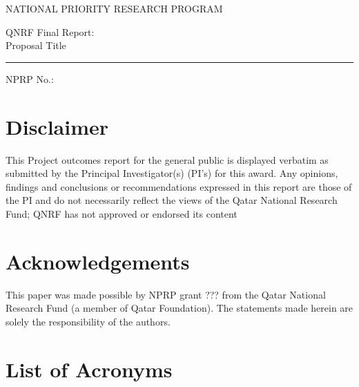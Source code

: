 \documentclass[11pt,letterpaper]{article}
\begin{document}
\begin{titlepage}
\begin{center}
\fontsize{11}{15}
\selectfont
NATIONAL PRIORITY RESEARCH PROGRAM

\vspace{4.5cm}

\fontsize{40}{48}
\selectfont
QNRF Final Report:\\
Proposal Title
\vspace{0.4cm}
{\color{blue2}\hrule}
\vspace{0.4cm}
\fontsize{22}{26}
\selectfont
NPRP No.:

\end{center}
\end{titlepage}

\rfoot{}

\newpage
\section*{Disclaimer}
This Project outcomes report for the general public is displayed verbatim as submitted by the Principal Investigator(s) (PI’s) for this award. Any opinions, findings and conclusions or recommendations expressed in this report are those of the PI and do not necessarily reflect the views of the Qatar National Research Fund; QNRF has not approved or endorsed its content

\newpage
\section*{Acknowledgements}
This paper was made possible by NPRP grant ??? from the Qatar National Research Fund (a
member of Qatar Foundation). The statements made herein are solely the responsibility of the authors.

\newpage
\setcounter{page}{1}
\renewcommand\contentsname{Table of Contents}
\tableofcontents

\newpage
\listoftables

\newpage
\listoffigures

\newpage
\section*{List of Acronyms}
\end{document}
